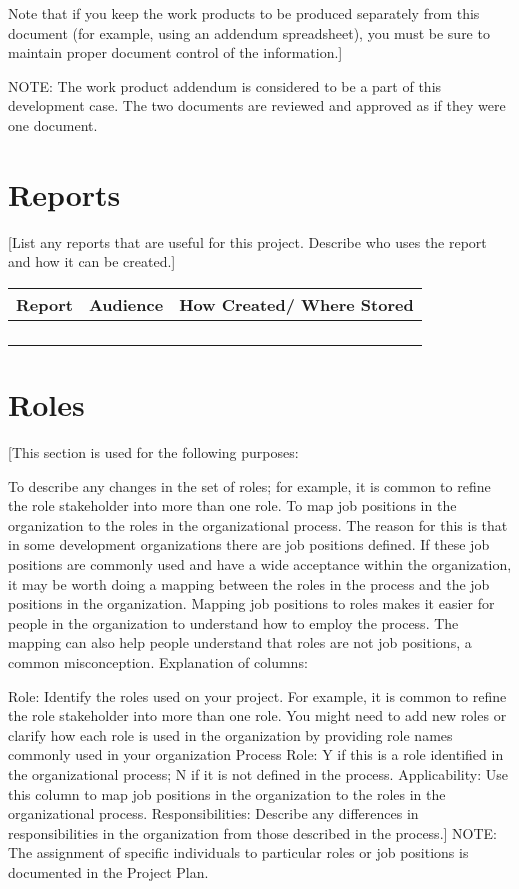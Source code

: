 Note that if you keep the work products to be produced separately from this document (for example, using an addendum spreadsheet), you must be sure to maintain proper document control of the information.]

NOTE: The work product addendum is considered to be a part of this development case. The two documents are reviewed and approved as if they were one document.


\section*{Reports}
[List any reports that are useful for this project. Describe who uses the report and how it can be created.]

\begin{tabular}{|c|c|c|}
    \hline
    Report & Audience & How Created/ Where Stored\\ \hline
    && \\ \hline
    && \\ \hline
    && \\ \hline
    && \\ \hline
\end{tabular}

\section*{Roles}
[This section is used for the following purposes:

To describe any changes in the set of roles; for example, it is common to refine the role stakeholder into more than one role.
To map job positions in the organization to the roles in the organizational process. The reason for this is that in some development organizations there are job positions defined. If these job positions are commonly used and have a wide acceptance within the organization, it may be worth doing a mapping between the roles in the process and the job positions in the organization. Mapping job positions to roles makes it easier for people in the organization to understand how to employ the process. The mapping can also help people understand that roles are not job positions, a common misconception.
Explanation of columns:

Role: Identify the roles used on your project. For example, it is common to refine the role stakeholder into more than one role. You might need to add new roles or clarify how each role is used in the organization by providing role names commonly used in your organization
Process Role: Y if this is a role identified in the organizational process; N if it is not defined in the process.
Applicability: Use this column to map job positions in the organization to the roles in the organizational process.
Responsibilities: Describe any differences in responsibilities in the organization from those described in the process.]
NOTE: The assignment of specific individuals to particular roles or job positions is documented in the Project Plan.

